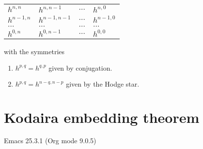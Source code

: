 \documentclass[11pt]{article}
\begin{document}
\begin{center}
\begin{tabular}{llll}
\(h^{n,n}\) & \(h^{n, n-1}\) & \(\dots\) & \(h^{n,0}\)\\
\(h^{n-1,n}\) & \(h^{n-1,n-1}\) & \(\dots\) & \(h^{n-1,0}\)\\
\(\dots\) & \(\dots\) & \(\dots\) & \(\dots\)\\
\(h^{0,n}\) & \(h^{0, n-1}\) & \(\dots\) & \(h^{0,0}\)\\
\end{tabular}
\end{center}

with the symmetries
\begin{enumerate}
\item \(h^{p,q} = h^{q,p}\) given by conjugation.
\item \(h^{p,q} =h^{n-q, n-p}\) given by the Hodge star.
\end{enumerate}


\section{Kodaira embedding theorem}
\label{sec:orgef4301b}
Emacs 25.3.1 (Org mode 9.0.5)
\end{document}
